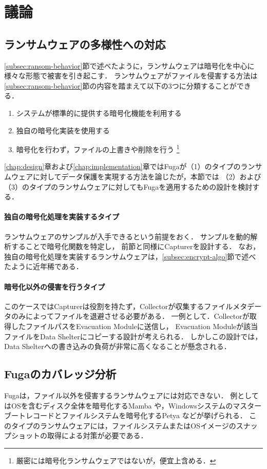 \chapter{議論}
\label{chap:discussion}
\section{ランサムウェアの多様性への対応}
\ref{subsec:ransom-behavior}節で述べたように，ランサムウェアは暗号化を中心に様々な形態で被害を引き起こす．
ランサムウェアがファイルを侵害する方法は\ref{subsec:ransom-behavior}節の内容を踏まえて以下の3つに分類することができる．
\begin{enumerate}
  \item システムが標準的に提供する暗号化機能を利用する
  \item 独自の暗号化実装を使用する
  \item 暗号化を行わず，ファイルの上書きや削除を行う \footnote{厳密には暗号化ランサムウェアではないが，便宜上含める．}
\end{enumerate}
\ref{chap:design}章および\ref{chap:implementation}章ではFugaが（1）のタイプのランサムウェアに対してデータ保護を実現する方法を論じたが，本節では
（2）および（3）のタイプのランサムウェアに対してもFugaを適用するための設計を検討する．

\subsubsection{独自の暗号化処理を実装するタイプ}
ランサムウェアのサンプルが入手できるという前提をおく．
サンプルを動的解析することで暗号化関数を特定し，
前節と同様にCapturerを設計する．
なお，独自の暗号化処理を実装するランサムウェアは，\ref{subsec:encrypt-algo}節で述べたように近年稀である．


\subsubsection{暗号化以外の侵害を行うタイプ}
このケースではCapturerは役割を持たず，Collectorが収集するファイルメタデータのみによってファイルを退避させる必要がある．
一例として．Collectorが取得したファイルパスをEvacuation Moduleに送信し，
Evacuation Moduleが該当ファイルをData Shelterにコピーする設計が考えられる．
しかしこの設計では，Data Shelterへの書き込みの負荷が非常に高くなることが懸念される．


\section{Fugaのカバレッジ分析}
Fugaは，ファイル以外を侵害するランサムウェアには対応できない．
例としてはOSを含むディスク全体を暗号化するMamba \cite{mamba-petya} や，Windowsシステムのマスターブートレコードとファイルシステムを暗号化するPetya \cite{mamba-petya} などが挙げられる．
このタイプのランサムウェアには，ファイルシステムまたはOSイメージのスナップショットの取得による対策が必要である．

